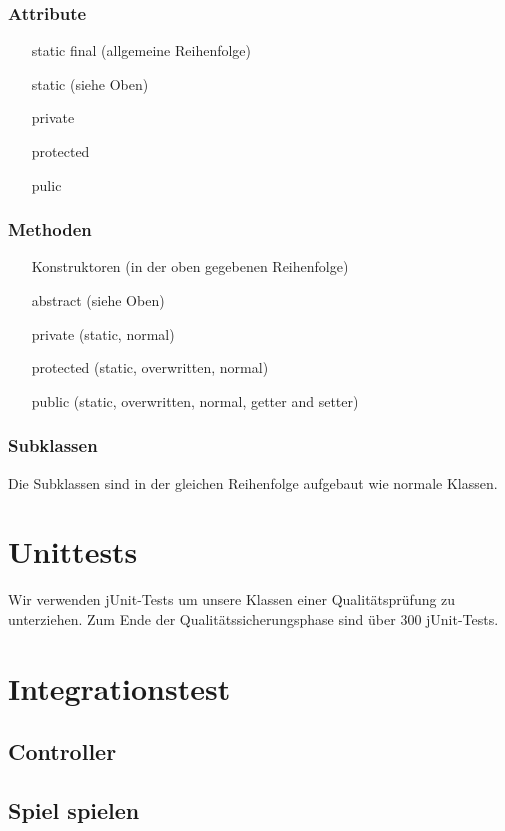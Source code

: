 \documentclass[parskip=full]{scrreprt}
\begin{document}
\subsection{Attribute}
\begin{enumerate}
	\item[static final] (allgemeine Reihenfolge) 
	\item[static] (siehe Oben)
	\item[private]
	\item[protected]
	\item[pulic]
\end{enumerate}
\subsection{Methoden}
\begin{enumerate}
	\item[Konstruktoren] (in der oben gegebenen Reihenfolge)
	\item[abstract] (siehe Oben)
	\item[private] (static, normal)
	\item[protected] (static, overwritten, normal)
	\item[public] (static, overwritten, normal, getter and setter)
\end{enumerate}
\subsection{Subklassen}
Die Subklassen sind in der gleichen Reihenfolge aufgebaut wie normale Klassen.



\chapter{Unittests}

Wir verwenden jUnit-Tests um unsere Klassen einer Qualitätsprüfung zu unterziehen. Zum Ende der Qualitätssicherungsphase sind über 300 jUnit-Tests.

\chapter{Integrationstest}

\section{Controller}

\section{Spiel spielen}
\end{document}
